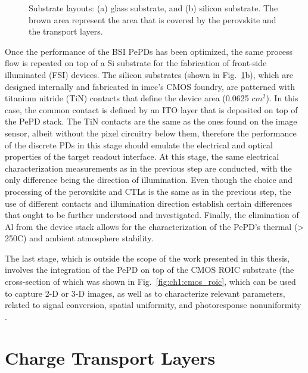 \begin{figure}[htbp]
    \caption{Substrate layouts: (a) glass substrate, and (b) silicon substrate. The brown area represent the area that is covered by the perovskite and the transport layers. }
    \label{fig:ch2:types_of_substrates}
\end{figure}


Once the performance of the BSI PePDs has been optimized, the same process flow is repeated on top of a Si substrate for the fabrication of front-side illuminated (FSI) devices. The silicon substrates (shown in Fig.~\ref{fig:ch2:types_of_substrates}b), which are designed internally and fabricated in imec's CMOS foundry, are patterned with titanium nitride (TiN) contacts that define the device area (0.0625 $cm^2$). In this case, the common contact is defined by an ITO layer that is deposited on top of the PePD stack. The TiN contacts are the same as the ones found on the image sensor, albeit without the pixel circuitry below them, therefore the performance of the discrete PDs in this stage should emulate the electrical and optical properties of the target readout interface. At this stage, the same electrical characterization measurements as in the previous step are conducted, with the only difference being the direction of illumination. Even though the choice and processing of the perovskite and CTLs is the same as in the previous step, the use of different contacts and illumination direction establish certain differences that ought to be further understood and investigated. Finally, the elimination of Al from the device stack allows for the characterization of the PePD's thermal (> 250\degree C) and ambient atmosphere stability. 

The last stage, which is outside the scope of the work presented in this thesis, involves the integration of the PePD on top of the CMOS ROIC substrate (the cross-section of which was shown in Fig.~\ref{fig:ch1:cmos_roic}, which can be used to capture 2-D or 3-D images, as well as to characterize relevant parameters, related to signal conversion, spatial uniformity, and photoresponse nonuniformity \cite{Malinowski2023ImageAbsorbers, Song2024HalideImager}. 



\section{Charge Transport Layers}

